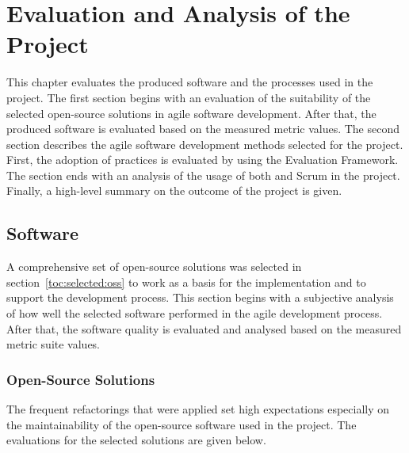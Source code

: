\chapter{Evaluation and Analysis of the Project}
\label{toc:result}

This chapter evaluates the produced software and the processes used in 
the project. The first section begins with an evaluation of the 
suitability of the selected open-source solutions in agile software 
development. After that, the produced software is evaluated based on 
the measured  metric values. The second section describes 
the agile software development methods selected for the project. 
First, the adoption of  practices is evaluated by using the 
 Evaluation Framework. The section ends with an analysis of 
the usage of both  and Scrum in the project. Finally, a 
high-level summary on the outcome of the project is given.


\section{Software}
\label{toc:result:software}

A comprehensive set of open-source solutions was selected in 
section~\ref{toc:selected:oss} to work as a basis for the 
implementation and to support the development process. This section 
begins with a subjective analysis of how well the selected software 
performed in the agile development process. After that, the software 
quality is evaluated and analysed based on the measured  
metric suite values.

\subsection{Open-Source Solutions}
\label{toc:result:software:oss}

The frequent refactorings that were applied set high expectations 
especially on the maintainability of the open-source software used in 
the project. The evaluations for the selected solutions are given 
below.


